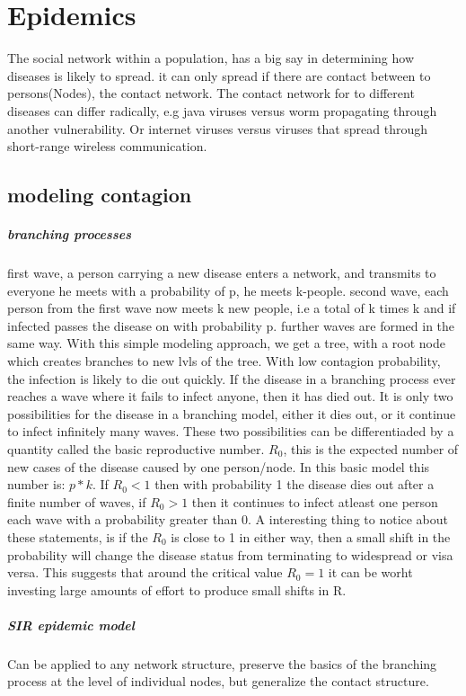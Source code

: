  \section{Epidemics}
 \cite{easley2012networks}
 The social network within a population, has a big say in determining how diseases is likely to
  spread. it can only spread if there are contact between to persons(Nodes), the contact network.
  The contact network for to different diseases can differ radically, e.g java viruses versus worm
   propagating through another vulnerability. Or internet viruses versus viruses that spread through short-range wireless communication. 
   \subsection{modeling contagion}
   \subparagraph{branching processes}
   first wave, a person carrying a new disease enters a network, and transmits to everyone he meets with a probability of p, he meets k-people.
second wave, each person from the first wave now meets k new people, i.e a total of k times k and if infected passes the disease on with probability p.
further waves are formed in the same way.
With this simple modeling approach, we get a tree, with a root node which creates branches to new
lvls of the tree. With low contagion probability, the infection is likely to die out quickly. 
If the disease in a branching process ever reaches a wave where it fails to infect anyone, then it has died out. It is only two possibilities for the disease in a branching model, 
either it dies out, or it continue to infect infinitely  many waves. These two possibilities can be
 differentiaded by a quantity called the basic reproductive number.  $R_{0}$, this is the expected
  number of new cases of the disease caused by one person/node. In this basic model this number is:
   $p*k$. If $R_{0}<1$ then with probability 1 the disease dies out after a finite number of waves, if $R_{0}>1$ then it continues to infect atleast one person each wave with a probability greater than 0.
   A interesting thing to notice about these statements, is if the $R_{0}$ is close to 1 in 
   either way, then a small shift in the probability will change the 
   disease status from terminating to widespread or visa versa. This suggests that around the critical value $R_{0}=1 $ it can be worht investing large amounts of effort to produce small shifts in R. 
\subparagraph{SIR epidemic model}
Can be applied to any network structure, preserve the basics of the branching process at the level of individual nodes, but generalize the contact structure. 

